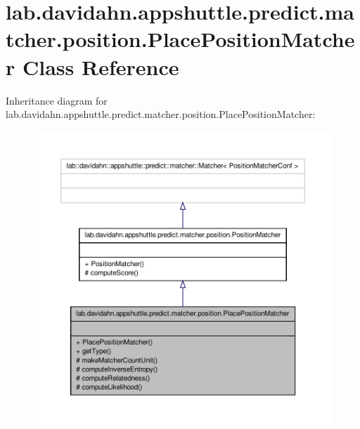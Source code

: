 \hypertarget{classlab_1_1davidahn_1_1appshuttle_1_1predict_1_1matcher_1_1position_1_1_place_position_matcher}{\section{lab.\-davidahn.\-appshuttle.\-predict.\-matcher.\-position.\-Place\-Position\-Matcher \-Class \-Reference}
\label{classlab_1_1davidahn_1_1appshuttle_1_1predict_1_1matcher_1_1position_1_1_place_position_matcher}
}


\-Inheritance diagram for lab.\-davidahn.\-appshuttle.\-predict.\-matcher.\-position.\-Place\-Position\-Matcher\-:
\nopagebreak
\begin{figure}[H]
\begin{center}
\leavevmode
\includegraphics[width=350pt]{classlab_1_1davidahn_1_1appshuttle_1_1predict_1_1matcher_1_1position_1_1_place_position_matcher__inherit__graph}
\end{center}
\end{figure}


